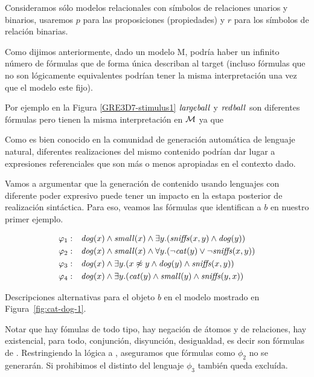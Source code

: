 
Consideramos s\'olo modelos relacionales con s\'imbolos de relaciones unarios y binarios, usaremos $p$ para las proposiciones (propiedades) y $r$ para los s\'imbolos de relaci\'on binarias.


Como dijimos anteriormente, dado un modelo M, podr\'ia haber un infinito n\'umero de f\'ormulas que de forma \'unica
describan al target (incluso f\'ormulas que no son l\'ogicamente equivalentes podr\'ian tener
la misma interpretaci\'on una vez que el modelo este fijo). 

Por ejemplo en la Figura \ref{GRE3D7-stimulus1} $\mathit{large} \mathit{ball}$ y $\mathit{red} \mathit{ball}$ son diferentes f\'ormulas pero tienen la misma interpretaci\'on en $\mathcal{M}$ ya que 

Como es bien conocido en la comunidad de generaci\'on autom\'atica de lenguaje natural, diferentes
realizaciones del mismo contenido podr\'ian dar lugar a expresiones referenciales que son m\'as o menos
apropiadas en el contexto dado. 

Vamos a argumentar que la generaci\'on de contenido usando lenguajes con diferente poder expresivo puede tener un impacto en la estapa posterior de realizaci\'on sint\'actica. Para eso, veamos las f\'ormulas que identifican a $b$ en nuestro primer ejemplo.

\begin{table}
$$
\begin{array}{cl}
 \varphi_1: & \mathit{dog}(x) \land \mathit{small}(x) \land
   \exists y . (\mathit{sniffs}(x,y) \land \mathit{dog}(y))\\[3pt]
  \varphi_2: & \mathit{dog}(x) \land \mathit{small}(x) \land
  \forall y . (\neg \mathit{cat}(y) \lor \neg \mathit{sniffs}(x,y))\\[3pt]
  \varphi_3: & \mathit{dog}(x) \land
  \exists y . (x \not\approx y \land \mathit{dog}(y)  \land \mathit{sniffs}(x,y))\\[3pt]
  \varphi_4: & \mathit{dog}(x) \land
  \exists y . (\mathit{cat}(y) \land \mathit{small}(y) \land \mathit{sniffs}(y,x))
 \end{array}
$$
\caption{Descripciones alternativas para el objeto $b$ en el modelo mostrado en Figura~\ref{fig:cat-dog-1}.}\label{tab:gammas}
\end{table}

Notar que hay f\'omulas de todo tipo, hay negaci\'on de \'atomos y de relaciones, hay existencial, para todo, conjunci\'on, disyunci\'on, desigualdad, es decir son f\'ormulas de \FOL.
Restringiendo la l\'ogica a \EPFOL, aseguramos que f\'ormulas como  $\phi_2$ no se generar\'an. Si prohibimos el distinto del lenguaje  $\phi_3$ tambi\'en queda exclu\'ida.

